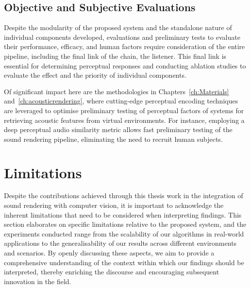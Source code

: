 \subsection{Objective and Subjective Evaluations}
Despite the modularity of the proposed system and the standalone nature of individual components developed, evaluations and preliminary tests to evaluate their performance, efficacy, and human factors require consideration of the entire pipeline, including the final link of the chain, the listener. This final link is essential for determining perceptual responses and conducting ablation studies to evaluate the effect and the priority of individual components.\par
Of significant impact here are the methodologies in Chapters~\ref{ch:Materials} and~\ref{ch:acousticrendering}, where cutting-edge perceptual encoding techniques are leveraged to optimise preliminary testing of perceptual factors of systems for retrieving acoustic features from virtual environments. For instance, employing a deep perceptual audio similarity metric allows fast preliminary testing of the sound rendering pipeline, eliminating the need to recruit human subjects.

\section{Limitations}
Despite the contributions achieved through this thesis work in the integration of sound rendering with computer vision, it is important to acknowledge the inherent limitations that need to be considered when interpreting findings. This section elaborates on specific limitations relative to the proposed system, and the experiments conducted range from the scalability of our algorithms in real-world applications to the generalisability of our results across different environments and scenarios. By openly discussing these aspects, we aim to provide a comprehensive understanding of the context within which our findings should be interpreted, thereby enriching the discourse and encouraging subsequent innovation in the field.


